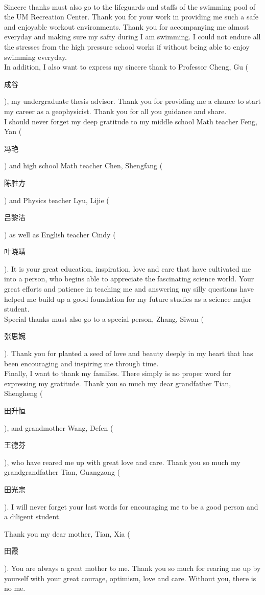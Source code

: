 \\
Sincere thanks must also go to the lifeguards and staffs of the swimming pool of the UM Recreation Center. Thank you for your work in providing me such a safe and enjoyable workout environments. Thank you for accompanying me almost everyday and making sure my safty during I am swimming. I could not endure all the stresses from the high pressure school works if without being able to enjoy swimming everyday.  
\\
In addition, I also want to express my sincere thank to Professor Cheng, Gu (\begin{CJK}{UTF8}{gbsn}成谷\end{CJK}), my undergraduate thesis advisor. Thank you for providing me a chance to start my career as a geophysicist. Thank you for all you guidance and share. 
\\
I should never forget my deep gratitude to my middle school Math teacher Feng, Yan (\begin{CJK}{UTF8}{gbsn}冯艳\end{CJK}) and high school Math teacher Chen, Shengfang (\begin{CJK}{UTF8}{gbsn}陈胜方\end{CJK}) and Physics teacher Lyu, Lijie (\begin{CJK}{UTF8}{gbsn}吕黎洁\end{CJK}) as well as English teacher Cindy (\begin{CJK}{UTF8}{gbsn}叶晓靖\end{CJK}). It is your great education, inspiration, love and care that have cultivated me into a person, who begins able to appreciate the fascinating science world. Your great efforts and patience in teaching me and answering my silly questions have helped me build up a good foundation for my future studies as a science major student.
\\
Special thanks must also go to a special person, Zhang, Siwan (\begin{CJK}{UTF8}{gbsn}张思婉\end{CJK}). Thank you for planted a seed of love and beauty deeply in my heart that has been encouraging and inspiring me through time.    
\\
Finally, I want to thank my families. There simply is no proper word for expressing my gratitude. Thank you so much my dear grandfather Tian, Shengheng (\begin{CJK}{UTF8}{gbsn}田升恒\end{CJK}), and grandmother Wang, Defen (\begin{CJK}{UTF8}{gbsn}王德芬\end{CJK}), who have reared me up with great love and care. Thank you so much my grandgrandfather Tian, Guangzong (\begin{CJK}{UTF8}{gbsn}田光宗\end{CJK}). I will never forget your last words for encouraging me to be a good person and a diligent student.

Thank you my dear mother, Tian, Xia (\begin{CJK}{UTF8}{gbsn}田霞\end{CJK}). You are always a great mother to me. Thank you so much for rearing me up by yourself with your great courage, optimism, love and care. Without you, there is no me.
